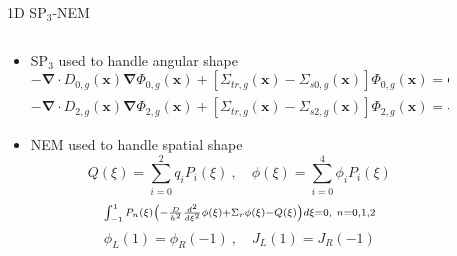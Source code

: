 
\begin{frame}[t]{1D SP$_3$-NEM}
    
    \begin{columns}
      \begin{column}{0.6\textwidth}
        \begin{itemize}
          \item SP$_3$ used to handle angular shape
          \begin{dmath*}\scriptstyle
            {-\bm{\nabla} \cdot D_{0,g} \left(\bm x\right) \bm \nabla 
            \Phi_{0,g}\left(\bm x\right) + \left[\Sigma_{tr,g}\left(\bm 
            x\right) - \Sigma_{s0,g}\left(\bm 
            x\right)\right]\Phi_{0,g}\left(\bm x\right)} = {Q_g\left(\bm 
            x\right) + 2\left[\Sigma_{tr,g}\left(\bm x\right) - 
            \Sigma_{s0,g}\left(\bm x\right)\right]\Phi_{2,g}\left(\bm 
            x\right)}
          \end{dmath*}
          \begin{dmath*}\scriptstyle
            {-\bm{\nabla} \cdot D_{2,g} \left(\bm x\right) \bm \nabla 
            \Phi_{2,g}\left(\bm x\right) + \left[\Sigma_{tr,g}\left(\bm 
            x\right) - \Sigma_{s2,g}\left(\bm 
            x\right)\right]\Phi_{2,g}\left(\bm x\right)} = 
            {\frac{2}{5}\left\lbrace \left[\Sigma_{tr,g}\left(\bm x\right) - 
            \Sigma_{s0,g}\left(\bm x\right)\right]\left[\Phi_{0,g}\left(\bm 
            x\right) - 2\Phi_{2,g}\left(\bm x\right)\right] - Q_g\left(\bm 
            x\right) \right\rbrace}
          \end{dmath*}
          \item NEM used to handle spatial shape
          \begin{equation*}\scriptstyle
          Q\left(\xi\right) = \sum_{i=0}^2 q_i P_i\left(\xi\right)\ , \quad 
          \phi\left(\xi\right) = \sum_{i=0}^4 \phi_i P_i\left(\xi\right)
          \end{equation*}
          \begin{equation*}\scriptstyle
          \intop_{-1}^1 P_n\left(\xi\right) 
          \left(-\frac{D}{h^2}\frac{d^2}{d\xi^2}\phi\left(\xi\right) + \Sigma_r 
          \phi\left(\xi\right) - Q\left(\xi\right)\right)d\xi = 0,\ n=0,1,2
          \end{equation*}
          \begin{equation*}\scriptstyle
          \phi_L\left(1\right) = \phi_R\left(-1\right)\ , \quad 
          J_L\left(1\right) = J_R\left(-1\right)
          \end{equation*}
        \end{itemize}
      \end{column}
    \begin{column}{0.4\textwidth}
      \begin{figure}[h]
        \centering
        \resizebox{!}{0.5\textheight}{}
      \end{figure}
    \end{column}
    \end{columns}
    

\end{frame}
